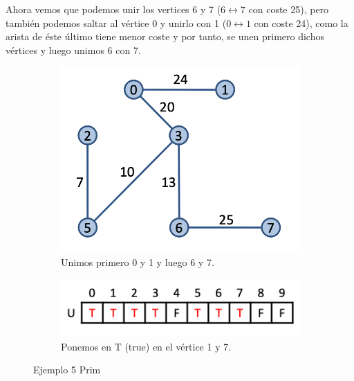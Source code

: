 Ahora vemos que podemos unir los vertices 6 y 7 (\(6 \leftrightarrow 7\) con coste 25), pero también podemos saltar al vértice 0 y unirlo con 1 (\(0 \leftrightarrow 1\) con coste 24), como la arista de éste último tiene menor coste y por tanto, se unen primero dichos vértices y luego unimos 6 con 7.
\begin{figure}[h]
  \begin{minipage}{0.4\textwidth}
    \centering
    \begin{subfigure}{\textwidth}
      \centering
      \includegraphics[width=.5\textwidth]{assets/prim13.png}
      \caption{Unimos primero 0 y 1 y luego 6 y 7.}
    \end{subfigure}
  \end{minipage}
  \hfill
  \begin{minipage}{0.5\textwidth}
    \centering
    \begin{subfigure}{\textwidth}
      \centering
      \includegraphics[width=.8\textwidth]{assets/prim14.png}
      \caption{Ponemos en T (true) en el vértice 1 y 7.}
    \end{subfigure}
  \end{minipage}
  \caption{Ejemplo 5 Prim}
\end{figure}

